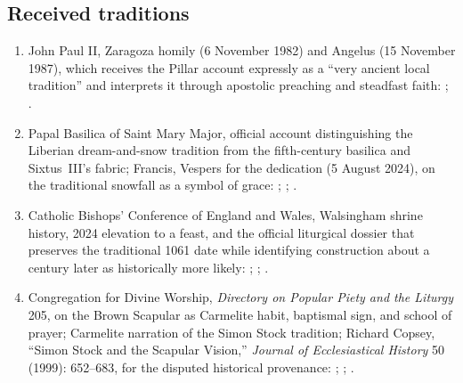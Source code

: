 \subsection{Received traditions}

\begin{enumerate}
  \item John Paul II, Zaragoza homily (6 November 1982) and Angelus (15 November 1987), which receives the Pillar account expressly as a ``very ancient local tradition'' and interprets it through apostolic preaching and steadfast faith: ; .
  \item Papal Basilica of Saint Mary Major, official account distinguishing the Liberian dream-and-snow tradition from the fifth-century basilica and Sixtus~III's fabric; Francis, Vespers for the dedication (5 August 2024), on the traditional snowfall as a symbol of grace: ; ; .
  \item Catholic Bishops' Conference of England and Wales, Walsingham shrine history, 2024 elevation to a feast, and the official liturgical dossier that preserves the traditional 1061 date while identifying construction about a century later as historically more likely: ; ; .
  \item Congregation for Divine Worship, \emph{Directory on Popular Piety and the Liturgy} 205, on the Brown Scapular as Carmelite habit, baptismal sign, and school of prayer; Carmelite narration of the Simon Stock tradition; Richard Copsey, ``Simon Stock and the Scapular Vision,'' \emph{Journal of Ecclesiastical History} 50 (1999): 652--683, for the disputed historical provenance: ; ; .

\end{enumerate}
